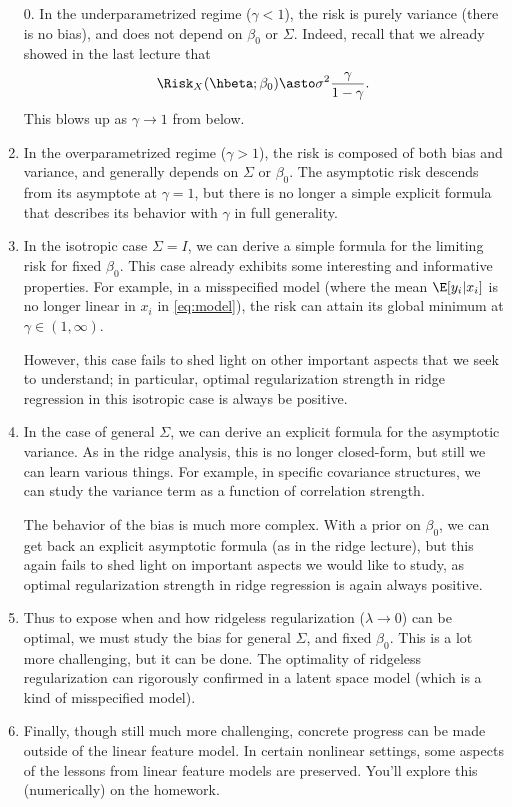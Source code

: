 \documentclass{article}
\begin{document}
\begin{enumerate}
\item[0.]
In the underparametrized regime ($\gamma < 1$), the risk is purely variance
(there is no bias), and does not depend on $\beta_0$ or $\Sigma$. Indeed, recall
that we already showed in the last lecture that
\begin{equation}
\label{eq:ls_risk_limit}
\Risk_X(\hbeta; \beta_0) \asto \sigma^2 \frac{\gamma}{1-\gamma}.
\end{equation}
This blows up as $\gamma \to 1$ from below. 

\item
In the overparametrized regime ($\gamma > 1$), the risk is composed of both
bias and variance, and generally depends on $\Sigma$ or $\beta_0$. The
asymptotic risk descends from its asymptote at $\gamma = 1$, but there is no
longer a simple explicit formula that describes its behavior with $\gamma$ in
full generality.

\item
In the isotropic case $\Sigma = I$, we can derive a simple formula for the
limiting risk for fixed $\beta_0$. This case already exhibits some interesting
and informative properties. For example, in a misspecified model (where the mean
$\E[y_i|x_i]$ is no longer linear in $x_i$ in \eqref{eq:model}), the risk can
attain its global minimum at $\gamma \in (1,\infty)$. 

However, this case fails to shed light on other important aspects that we seek
to understand; in particular, optimal regularization strength in ridge
regression in this isotropic case is always be positive.

\item
In the case of general $\Sigma$, we can derive an explicit formula for the
asymptotic variance. As in the ridge analysis, this is no longer closed-form,
but still we can learn various things. For example, in specific covariance
structures, we can study the variance term as a function of correlation
strength.    

The behavior of the bias is much more complex. With a prior on $\beta_0$, we can 
get back an explicit asymptotic formula (as in the ridge lecture), but this
again fails to shed light on important aspects we would like to study, as
optimal regularization strength in ridge regression is again always positive.     

\item
Thus to expose when and how ridgeless regularization ($\lambda \to 0$) can be
optimal, we must study the bias for general $\Sigma$, and fixed $\beta_0$. This
is a lot more challenging, but it can be done. The optimality of ridgeless 
regularization can rigorously confirmed in a latent space model (which is a kind
of misspecified model). 

\item
Finally, though still much more challenging, concrete progress can be made
outside of the linear feature model. In certain nonlinear settings, some aspects
of the lessons from linear feature models are preserved. You'll explore this 
(numerically) on the homework.  
\end{enumerate}
\end{document}
